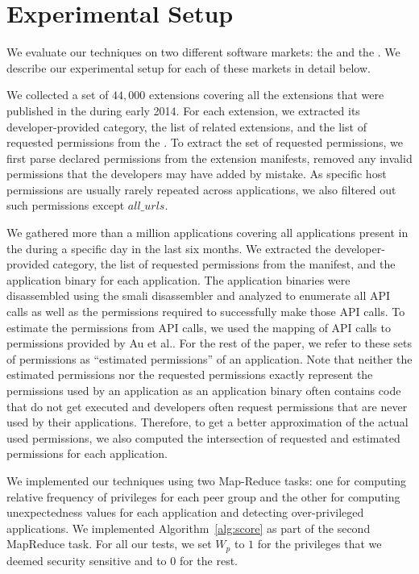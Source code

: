 \section{Experimental Setup}
\label{setup}
We evaluate our techniques on two different software markets: the \ChromeMarket{}
and the \AndroidMarket{}. We describe our experimental  setup for each of 
these markets in detail below.  

We collected a set of $44,000$ \Chrome{} extensions covering all the extensions that were published in the \ChromeMarket{} during early 2014. For each extension, we extracted
its developer-provided category, the list of related extensions, and the list of requested 
permissions from the \ChromeMarket{}. To extract the set of requested permissions, 
we first parse declared permissions from the extension manifests, removed any 
invalid permissions that the developers may have added by mistake. As specific host 
permissions are usually rarely repeated across applications, we also filtered out such 
permissions except $all\_urls$. 



We gathered more than a million \Android{} applications covering all applications present in the \AndroidMarket{} during a specific day in the last six months. We extracted  the developer-provided category, the list of requested permissions 
from the manifest, and the application binary for each application. The application binaries were disassembled 
using the smali disassembler and analyzed to enumerate all API calls as well as the permissions required 
to successfully make those API calls. To estimate the permissions from API calls, we used the mapping of 
API calls to permissions provided by Au et al.\cite{au2012pscout}. For the rest of the paper, we refer to 
these sets of permissions as ``estimated permissions'' of an application. Note that neither the estimated 
permissions nor the requested permissions exactly represent the permissions used by an 
application as an application binary often contains code that do not get executed and developers 
often request permissions that are never used by their applications. Therefore, to get a better approximation 
of the actual used permissions, we also computed the intersection of requested and estimated permissions
for each application.

 We implemented our techniques using two Map-Reduce tasks: one for computing 
relative frequency of privileges for each peer group and the other for computing unexpectedness values for 
each application and detecting over-privileged applications. We implemented Algorithm~\ref{alg:score} as part of 
the second MapReduce task. For all our tests, we set $W_p$ to $1$ for the privileges that we deemed security 
sensitive and to $0$ for the rest.  



